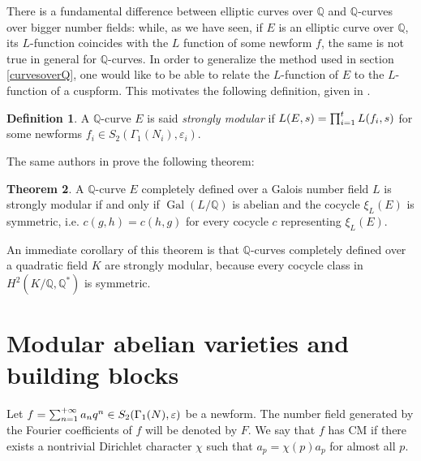 \documentclass[11pt]{amsart}
\theoremstyle{definition}
\newtheorem{definizione}{Definition}[section]
\newtheorem{thm}[definizione]{Theorem}
\begin{document}
		There is a fundamental difference between elliptic curves over ${\mathbb{Q}}$ and ${\mathbb{Q}}$-curves over bigger number fields: while, as we have seen, if $E$ is an elliptic curve over ${\mathbb{Q}}$, its $L$-function coincides with the $L$ function of some newform $f$, the same is not true in general for ${\mathbb{Q}}$-curves. In order to generalize the method used in section \ref{curvesoverQ}, one would like to be able to relate the $L$-function of $E$ to the $L$-function of a cuspform. This motivates the following definition, given in \cite{guique}.
			\begin{definizione}
				A ${\mathbb{Q}}$-curve $E$ is said \emph{strongly modular} if ${\displaystyle} L(E,s)=\prod_{i=1}^tL(f_i,s)$ for some newforms $f_i\in S_2(\Gamma_1(N_i),\varepsilon_i)$.
		\end{definizione}
		The same authors in \cite{guique} prove the following theorem:
			\begin{thm}
				A ${\mathbb{Q}}$-curve $E$ completely defined over a Galois number field $L$ is strongly modular if and only if $\operatorname{Gal}(L/{\mathbb{Q}})$ is abelian and the cocycle $\xi_L(E)$ is symmetric, i.e. $c(g,h)=c(h,g)$ for every cocycle $c$ representing $\xi_L(E)$.
		\end{thm}
		An immediate corollary of this theorem is that ${\mathbb{Q}}$-curves completely defined over a quadratic field $K$ are strongly modular, because every cocycle class in $H^2(K/{\mathbb{Q}},{\mathbb{Q}}^*)$ is symmetric.

	\section{Modular abelian varieties and building blocks}\label{buiblo}
  		Let ${\displaystyle} f=\sum_{n=1}^{+\infty}a_nq^n \in S_2(\Gamma_1(N),\varepsilon)$ be a newform. The number field 
  		generated by the Fourier coefficients of $f$ will be denoted by $F$. We say that
  		$f$ has CM if there exists a nontrivial Dirichlet character $\chi$ such that $a_p=\chi(p)a_p$ for almost all $p$.
\end{document}
